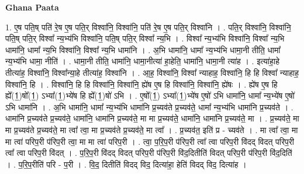 \documentclass[17pt]{extarticle}
\begin{document}
\textbf{Ghana Paata } \newline

1. ए॒ष पति॒ष् पति॑ रे॒ष ए॒ष पति॒र् विश्वा॑नि॒ विश्वा॑नि॒ पति॑ रे॒ष ए॒ष पति॒र् विश्वा॑नि । . पति॒र् विश्वा॑नि॒ विश्वा॑नि॒ पति॒ष् पति॒र् विश्वा᳚ न्य॒भ्य॑भि विश्वा॑नि॒ पति॒ष् पति॒र् विश्वा᳚ न्य॒भि । . विश्वा᳚ न्य॒भ्य॑भि विश्वा॑नि॒ विश्वा᳚ न्य॒भि धामा॑नि॒ धामा᳚ न्य॒भि विश्वा॑नि॒ विश्वा᳚ न्य॒भि धामा॑नि । . अ॒भि धामा॑नि॒ धामा᳚ न्य॒भ्य॑भि धामा॒नी तीति॒ धामा᳚ न्य॒भ्य॑भि धामा॒ नीति॑ । . धामा॒नी तीति॒ धामा॑नि॒ धामा॒नीत्या॑ हा॒हेति॒ धामा॑नि॒ धामा॒नी त्या॑ह । . इत्या॑हा॒हे तीत्या॑ह॒ विश्वा॑नि॒ विश्वा᳚न्या॒हे तीत्या॑ह॒ विश्वा॑नि । . आ॒ह॒ विश्वा॑नि॒ विश्वा᳚ न्याहाह॒ विश्वा॑नि॒ हि हि विश्वा᳚ न्याहाह॒ विश्वा॑नि॒ हि । . विश्वा॑नि॒ हि हि विश्वा॑नि॒ विश्वा॑नि॒ ह्ये॑ष ए॒ष हि विश्वा॑नि॒ विश्वा॑नि॒ ह्ये॑षः । . ह्ये॑ष ए॒ष हि ह्ये᳚(1॒)षो᳚(1॒) ऽभ्या᳚(1॒)भ्ये॑ष हि ह्ये᳚(1॒)षो॑ ऽभि । . ए॒षो᳚(1॒) ऽभ्या᳚(1॒)भ्ये॑ष ए॒षो॑ ऽभि धामा॑नि॒ धामा᳚ न्य॒भ्ये॑ष ए॒षो॑ ऽभि धामा॑नि । . अ॒भि धामा॑नि॒ धामा᳚ न्य॒भ्य॑भि धामा॑नि प्र॒च्यव॑ते प्र॒च्यव॑ते॒ धामा᳚ न्य॒भ्य॑भि धामा॑नि प्र॒च्यव॑ते । . धामा॑नि प्र॒च्यव॑ते प्र॒च्यव॑ते॒ धामा॑नि॒ धामा॑नि प्र॒च्यव॑ते॒ मा मा प्र॒च्यव॑ते॒ धामा॑नि॒ धामा॑नि प्र॒च्यव॑ते॒ मा । . प्र॒च्यव॑ते॒ मा मा प्र॒च्यव॑ते प्र॒च्यव॑ते॒ मा त्वा᳚ त्वा॒ मा प्र॒च्यव॑ते प्र॒च्यव॑ते॒ मा त्वा᳚ । . प्र॒च्यव॑त॒ इति॑ प्र - च्यव॑ते । . मा त्वा᳚ त्वा॒ मा मा त्वा॑ परिप॒री प॑रिप॒री त्वा॒ मा मा त्वा॑ परिप॒री । . त्वा॒ प॒रि॒प॒री प॑रिप॒री त्वा᳚ त्वा परिप॒री वि॑दद् विदत् परिप॒री त्वा᳚ त्वा परिप॒री वि॑दत् । . प॒रि॒प॒री वि॑दद् विदत् परिप॒री प॑रिप॒री वि॑द॒दितीति॑ विदत् परिप॒री प॑रिप॒री वि॑द॒दिति॑ । . प॒रि॒प॒रीति॑ परि - प॒री । . वि॒द॒ दितीति॑ विदद् विद॒ दित्या॑हा॒ हेति॑ विदद् विद॒ दित्या॑ह । \newline
\end{document}

